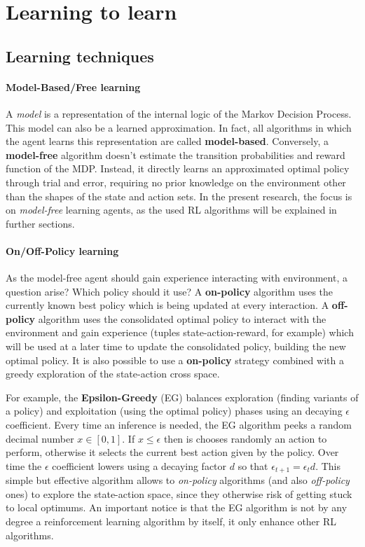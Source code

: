 \section{Learning to learn}

\subsection{Learning techniques}

\paragraph{Model-Based/Free learning}

A \textit{model} is a representation of the internal logic of the Markov Decision Process. This model can also be a learned approximation. In fact, all algorithms in which the agent learns this representation are called \textbf{model-based}. Conversely, a \textbf{model-free} algorithm doesn't estimate the transition probabilities and reward function of the MDP. Instead, it directly learns an approximated optimal policy through trial and error, requiring no prior knowledge on the environment other than the shapes of the state and action sets.
In the present research, the focus is on \textit{model-free} learning agents, as the used RL algorithms will be explained in further sections.

\paragraph{On/Off-Policy learning}

As the model-free agent should gain experience interacting with environment, a question arise? Which policy should it use? A \textbf{on-policy} algorithm uses the currently known best policy which is being updated at every interaction. A \textbf{off-policy} algorithm uses the consolidated optimal policy to interact with the environment and gain experience (tuples state-action-reward, for example) which will be used at a later time to update the consolidated policy, building the new optimal policy. It is also possible to use a \textbf{on-policy} strategy combined with a greedy exploration of the state-action cross space.

For example, the \textbf{Epsilon-Greedy} (EG) balances exploration (finding variants of a policy) and exploitation (using the optimal policy) phases using an decaying $\epsilon$ coefficient.
Every time an inference is needed, the EG algorithm peeks a random decimal number $x \in [0, 1]$. If $x \leq \epsilon$ then is chooses randomly an action to perform, otherwise it selects the current best action given by the policy.
Over time the $\epsilon$ coefficient lowers using a decaying factor $d$ so that $\epsilon_{t + 1} = \epsilon_{t} d$. This simple but effective algorithm allows to \textit{on-policy} algorithms (and also \textit{off-policy} ones) to explore the state-action space, since they otherwise risk of getting stuck to local optimums.
An important notice is that the EG algorithm is not by any degree a reinforcement learning algorithm by itself, it only enhance other RL algorithms.

